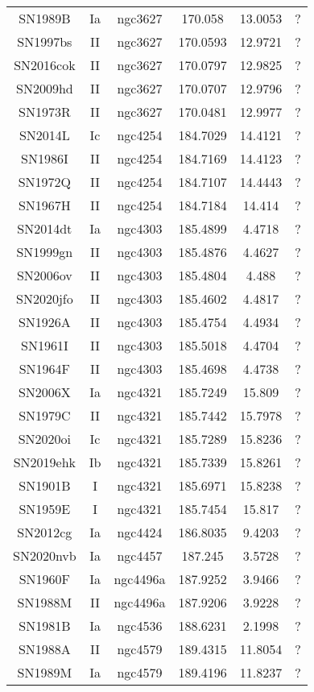 \begin{table}
\begin{tabular}{cccccc}
SN1989B & Ia & ngc3627 & 170.058 & 13.0053 & ? \\
SN1997bs & II & ngc3627 & 170.0593 & 12.9721 & ? \\
SN2016cok & II & ngc3627 & 170.0797 & 12.9825 & ? \\
SN2009hd & II & ngc3627 & 170.0707 & 12.9796 & ? \\
SN1973R & II & ngc3627 & 170.0481 & 12.9977 & ? \\
SN2014L & Ic & ngc4254 & 184.7029 & 14.4121 & ? \\
SN1986I & II & ngc4254 & 184.7169 & 14.4123 & ? \\
SN1972Q & II & ngc4254 & 184.7107 & 14.4443 & ? \\
SN1967H & II & ngc4254 & 184.7184 & 14.414 & ? \\
SN2014dt & Ia & ngc4303 & 185.4899 & 4.4718 & ? \\
SN1999gn & II & ngc4303 & 185.4876 & 4.4627 & ? \\
SN2006ov & II & ngc4303 & 185.4804 & 4.488 & ? \\
SN2020jfo & II & ngc4303 & 185.4602 & 4.4817 & ? \\
SN1926A & II & ngc4303 & 185.4754 & 4.4934 & ? \\
SN1961I & II & ngc4303 & 185.5018 & 4.4704 & ? \\
SN1964F & II & ngc4303 & 185.4698 & 4.4738 & ? \\
SN2006X & Ia & ngc4321 & 185.7249 & 15.809 & ? \\
SN1979C & II & ngc4321 & 185.7442 & 15.7978 & ? \\
SN2020oi & Ic & ngc4321 & 185.7289 & 15.8236 & ? \\
SN2019ehk & Ib & ngc4321 & 185.7339 & 15.8261 & ? \\
SN1901B & I & ngc4321 & 185.6971 & 15.8238 & ? \\
SN1959E & I & ngc4321 & 185.7454 & 15.817 & ? \\
SN2012cg & Ia & ngc4424 & 186.8035 & 9.4203 & ? \\
SN2020nvb & Ia & ngc4457 & 187.245 & 3.5728 & ? \\
SN1960F & Ia & ngc4496a & 187.9252 & 3.9466 & ? \\
SN1988M & II & ngc4496a & 187.9206 & 3.9228 & ? \\
SN1981B & Ia & ngc4536 & 188.6231 & 2.1998 & ? \\
SN1988A & II & ngc4579 & 189.4315 & 11.8054 & ? \\
SN1989M & Ia & ngc4579 & 189.4196 & 11.8237 & ? \\

\end{tabular}
\end{table}
